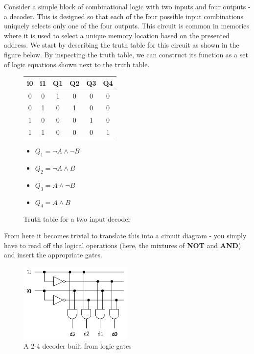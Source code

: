 \documentclass{article}
\begin{document}
	\par 
	Consider a simple block of combinational logic with two inputs and four outputs - a decoder. This is designed so that each of the four possible input combinations uniquely selects only one of the four outputs. This circuit is common in memories where it is used to select a unique memory location based on the presented address. We start by describing the truth table for this circuit as shown in the figure below. By inspecting the truth table, we can construct its function as a set of logic equations shown next to the truth table.
	\begin{figure}[h]
		\begin{minipage}[t]{.45\textwidth}
			\centering
			\begin{tabular}{c c | c c c c}
				i0 & i1 & Q1 & Q2 & Q3 & Q4  \\ \hline
				0 & 0 & 1 & 0 & 0 & 0 \\
				0 & 1 & 0 & 1 & 0 & 0 \\
				1 & 0 & 0 & 0 & 1 & 0 \\
				1 & 1 & 0 & 0 & 0 & 1
			\end{tabular}
			\caption{Truth table for a two input decoder}
			\label{fig:truth table two input decoder}
		\end{minipage}
		\hfill
		\begin{minipage}[t]{.45\textwidth}
			\begin{itemize}
				\item $Q_{1} = \neg A \wedge \neg B$
				\item $Q_{2} = \neg A \wedge B$
				\item $Q_{3} = A \wedge \neg B$
				\item $Q_{4} = A \wedge B$
			\end{itemize}
		\end{minipage}
	\end{figure}
	
	From here it becomes trivial to translate this into a circuit diagram - you simply have to read off the logical operations (here, the mixtures of \textbf{NOT} and \textbf{AND}) and insert the appropriate gates.
	\begin{figure}[h]
		\centering
		\includegraphics[width=0.5\textwidth]{2_4_decoder}
		\caption{A 2-4 decoder built from logic gates}
		\label{fig:2 4 decoder}
	\end{figure}
	
\end{document}
